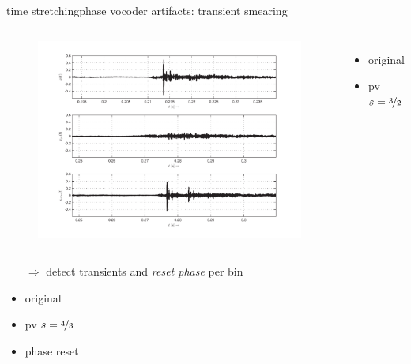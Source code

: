    \begin{frame}{time stretching}{phase vocoder artifacts: transient smearing}
        \vspace{-5mm}
        \begin{columns}
            \vspace{-5mm}
                \begin{figure}
                    \centering
                    \includegraphics[scale=.35]{graph/TransientSmear}
                \end{figure}\vspace{-5mm}

                \begin{itemize}
                    \item   original  
                    \item   pv $s = \nicefrac{3}{2}$ 
                \end{itemize}
        \end{columns}
        \pause
        \begin{itemize}
            \item[$\Rightarrow$] detect transients and \textit{reset phase} per bin
        \end{itemize}
                \begin{itemize}
                    \item   original  
                    \item   pv $s = \nicefrac{4}{3}$ 
                    \item   phase reset 
                \end{itemize}


    \end{frame}

